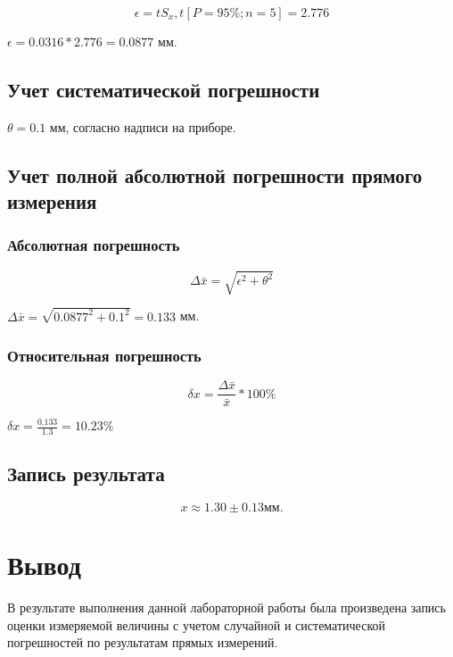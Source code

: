 \documentclass[12pt, a4paper]{article}
\begin{document}
$$\epsilon = t S_x, t [P = 95\%; n = 5] = 2.776$$

$\epsilon = 0.0316 * 2.776 = 0.0877$ мм.

\subsection*{Учет систематической погрешности}

$\theta = 0.1$ мм, согласно надписи на приборе.

\subsection*{Учет полной абсолютной погрешности прямого измерения}

\subsubsection*{Абсолютная погрешность}

$$\Delta \bar{x} = \sqrt{\epsilon^2 + \theta^2}$$

$\Delta \bar{x} = \sqrt{0.0877^2 + 0.1^2} = 0.133$ мм.

\subsubsection*{Относительная погрешность}

$$\delta x = \frac{\Delta \bar{x}}{\bar{x}} * 100\%$$

$\delta x = \frac{0.133}{1.3} = 10.23\%$

\subsection*{Запись результата}

$$x \approx 1.30 \pm 0.13 \text{мм.}$$

\section*{Вывод}

В результате выполнения данной лабораторной работы была произведена
запись оценки измеряемой величины с учетом случайной и систематической
погрешностей по результатам прямых измерений.
\end{document}
